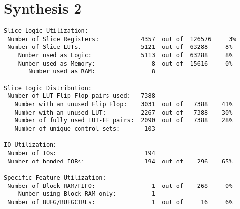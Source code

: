 \section{Synthesis 2}
\begin{verbatim}
Slice Logic Utilization: 
 Number of Slice Registers:            4357  out of  126576     3%  
 Number of Slice LUTs:                 5121  out of  63288     8%  
    Number used as Logic:              5113  out of  63288     8%  
    Number used as Memory:                8  out of  15616     0%  
       Number used as RAM:                8

Slice Logic Distribution: 
 Number of LUT Flip Flop pairs used:   7388
   Number with an unused Flip Flop:    3031  out of   7388    41%  
   Number with an unused LUT:          2267  out of   7388    30%  
   Number of fully used LUT-FF pairs:  2090  out of   7388    28%  
   Number of unique control sets:       103

IO Utilization: 
 Number of IOs:                         194
 Number of bonded IOBs:                 194  out of    296    65%  

Specific Feature Utilization:
 Number of Block RAM/FIFO:                1  out of    268     0%  
    Number using Block RAM only:          1
 Number of BUFG/BUFGCTRLs:                1  out of     16     6%  
\end{verbatim}
